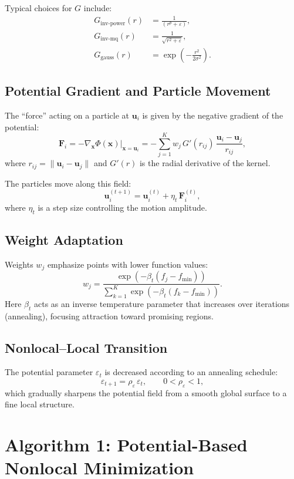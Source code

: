 \documentclass[12pt]{article}
\begin{document}
Typical choices for $G$ include:
\begin{align}
    G_\text{inv-power}(r) &= \frac{1}{(r^p + \varepsilon)}, \\
    G_\text{inv-mq}(r) &= \frac{1}{\sqrt{r^2 + \varepsilon}}, \\
    G_\text{gauss}(r) &= \exp\!\left(-\frac{r^2}{2\sigma^2}\right).
\end{align}

\subsection{Potential Gradient and Particle Movement}

The ``force'' acting on a particle at $\mathbf{u}_i$ is given by the negative gradient of the potential:
\[
\mathbf{F}_i = -\nabla_{\mathbf{x}} \Phi(\mathbf{x}) \big|_{\mathbf{x} = \mathbf{u}_i}
= - \sum_{j=1}^K w_j \, G'(r_{ij}) \, \frac{\mathbf{u}_i - \mathbf{u}_j}{r_{ij}},
\]
where $r_{ij} = \|\mathbf{u}_i - \mathbf{u}_j\|$ and $G'(r)$ is the radial derivative of the kernel.

The particles move along this field:
\[
\mathbf{u}_i^{(t+1)} = \mathbf{u}_i^{(t)} + \eta_t \, \mathbf{F}_i^{(t)},
\]
where $\eta_t$ is a step size controlling the motion amplitude.

\subsection{Weight Adaptation}

Weights $w_j$ emphasize points with lower function values:
\[
w_j = \frac{\exp(-\beta_t (f_j - f_{\min}))}{\sum_{k=1}^K \exp(-\beta_t (f_k - f_{\min}))}.
\]
Here $\beta_t$ acts as an inverse temperature parameter that increases over iterations (annealing), focusing attraction toward promising regions.

\subsection{Nonlocal--Local Transition}

The potential parameter $\varepsilon_t$ is decreased according to an annealing schedule:
\[
\varepsilon_{t+1} = \rho_\varepsilon \, \varepsilon_t, \qquad 0 < \rho_\varepsilon < 1,
\]
which gradually sharpens the potential field from a smooth global surface to a fine local structure.

\section{Algorithm 1: Potential-Based Nonlocal Minimization}
\end{document}
